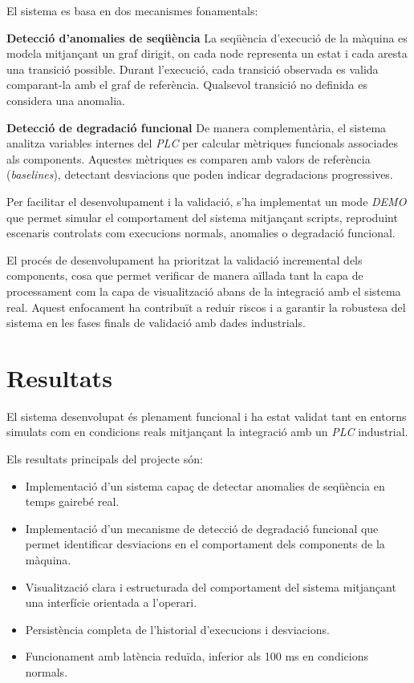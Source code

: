 El sistema es basa en dos mecanismes fonamentals:

\textbf{Detecció d’anomalies de seqüència}
La seqüència d’execució de la màquina es modela mitjançant un graf dirigit, on cada node representa un estat i cada aresta una transició possible. Durant l’execució, cada transició observada es valida comparant-la amb el graf de referència. Qualsevol transició no definida es considera una anomalia.

\textbf{Detecció de degradació funcional}
De manera complementària, el sistema analitza variables internes del \textit{PLC} per calcular mètriques funcionals associades als components. Aquestes mètriques es comparen amb valors de referència (\textit{baselines}), detectant desviacions que poden indicar degradacions progressives.

Per facilitar el desenvolupament i la validació, s’ha implementat un mode \textit{DEMO} que permet simular el comportament del sistema mitjançant scripts, reproduint escenaris controlats com execucions normals, anomalies o degradació funcional.

El procés de desenvolupament ha prioritzat la validació incremental dels components, cosa que permet verificar de manera aïllada tant la capa de processament com la capa de visualització abans de la integració amb el sistema real. Aquest enfocament ha contribuït a reduir riscos i a garantir la robustesa del sistema en les fases finals de validació amb dades industrials.


\section*{Resultats}
El sistema desenvolupat és plenament funcional i ha estat validat tant en entorns simulats com en condicions reals mitjançant la integració amb un \textit{PLC} industrial.

Els resultats principals del projecte són:

\begin{itemize}
    \item Implementació d’un sistema capaç de detectar anomalies de seqüència en temps gairebé real.
    \item Implementació d’un mecanisme de detecció de degradació funcional que permet identificar desviacions en el comportament dels components de la màquina.
    \item Visualització clara i estructurada del comportament del sistema mitjançant una interfície orientada a l’operari.
    \item Persistència completa de l’historial d’execucions i desviacions.
    \item Funcionament amb latència reduïda, inferior als 100 ms en condicions normals.
\end{itemize}


